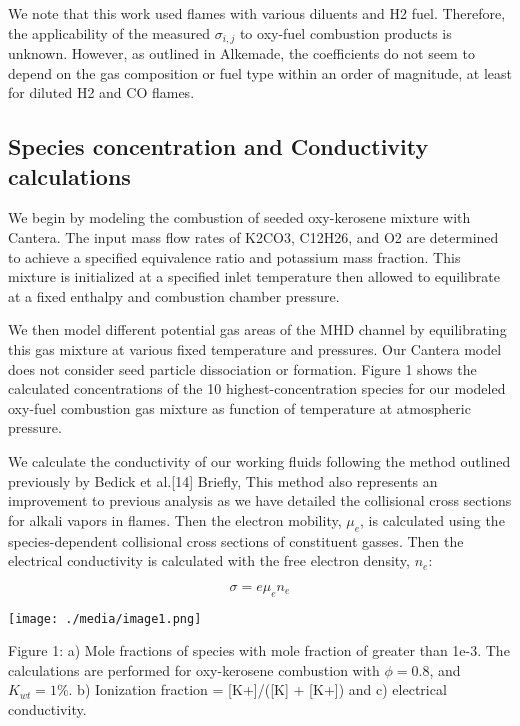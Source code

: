 We note that this work used flames with various diluents and H2 fuel. Therefore, the applicability of the measured \(\sigma_{i,j}\) to oxy-fuel combustion products is unknown. However, as outlined in Alkemade, the coefficients do not seem to depend on the gas composition or fuel type within an order of magnitude, at least for diluted H2 and CO flames.

\hypertarget{species-concentration-and-conductivity-calculations}{%
\subsection{Species concentration and Conductivity calculations}\label{species-concentration-and-conductivity-calculations}}

We begin by modeling the combustion of seeded oxy-kerosene mixture with Cantera. The input mass flow rates of K2CO3, C12H26, and O2 are determined to achieve a specified equivalence ratio and potassium mass fraction. This mixture is initialized at a specified inlet temperature then allowed to equilibrate at a fixed enthalpy and combustion chamber pressure.

We then model different potential gas areas of the MHD channel by equilibrating this gas mixture at various fixed temperature and pressures. Our Cantera model does not consider seed particle dissociation or formation. Figure 1 shows the calculated concentrations of the 10 highest-concentration species for our modeled oxy-fuel combustion gas mixture as function of temperature at atmospheric pressure.

We calculate the conductivity of our working fluids following the method outlined previously by Bedick et al.{[}14{]} Briefly, This method also represents an improvement to previous analysis as we have detailed the collisional cross sections for alkali vapors in flames. Then the electron mobility, \(\mu_{e}\), is calculated using the species-dependent collisional cross sections of constituent gasses. Then the electrical conductivity is calculated with the free electron density, \(n_{e}\):

\begin{equation}
\sigma = e\mu_{e}n_{e}
\end{equation}


\texttt{[image: ./media/image1.png]}

Figure 1: a) Mole fractions of species with mole fraction of greater than 1e-3. The calculations are performed for oxy-kerosene combustion with \(\phi = 0.8\), and \(K_{wt} = 1\%\). b) Ionization fraction = {[}K+{]}/({[}K{]} + {[}K+{]}) and c) electrical conductivity.


